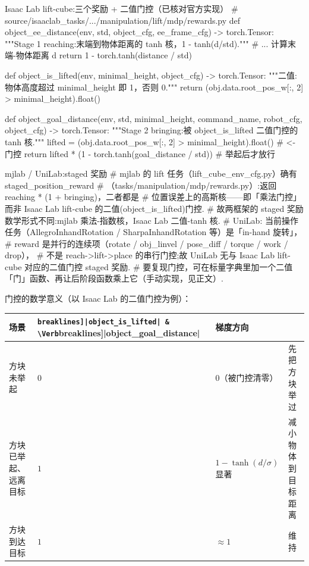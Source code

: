 \begin{codebox}[Python]{Isaac Lab lift-cube:三个奖励 + 二值门控（已核对官方实现）}
# source/isaaclab_tasks/.../manipulation/lift/mdp/rewards.py
def object_ee_distance(env, std, object_cfg, ee_frame_cfg) -> torch.Tensor:
    """Stage 1 reaching:末端到物体距离的 tanh 核，1 - tanh(d/std)."""
    # ... 计算末端-物体距离 d
    return 1 - torch.tanh(distance / std)

def object_is_lifted(env, minimal_height, object_cfg) -> torch.Tensor:
    """二值:物体高度超过 minimal_height 即 1，否则 0."""
    return (obj.data.root_pos_w[:, 2] > minimal_height).float()

def object_goal_distance(env, std, minimal_height, command_name,
                         robot_cfg, object_cfg) -> torch.Tensor:
    """Stage 2 bringing:被 object_is_lifted 二值门控的 tanh 核."""
    lifted = (obj.data.root_pos_w[:, 2] > minimal_height).float()   # <- 门控
    return lifted * (1 - torch.tanh(goal_distance / std))           # 举起后才放行
\end{codebox}

\begin{codebox}[Python]{mjlab / UniLab:staged 奖励}
# mjlab 的 lift 任务（lift_cube_env_cfg.py）确有 staged_position_reward
# （tasks/manipulation/mdp/rewards.py）:返回 reaching * (1 + bringing)，二者都是
# 位置误差上的高斯核——即「乘法门控」而非 Isaac Lab lift-cube 的二值(object_is_lifted)门控.
# 故两框架的 staged 奖励数学形式不同:mjlab 乘法-指数核，Isaac Lab 二值-tanh 核.
# UniLab: 当前操作任务（AllegroInhandRotation / SharpaInhandRotation 等）是「in-hand 旋转」，
#   reward 是并行的连续项（rotate / obj_linvel / pose_diff / torque / work / drop），
#   不是 reach->lift->place 的串行门控;故 UniLab 无与 Isaac Lab lift-cube 对应的二值门控 staged 奖励.
#   要复现门控，可在标量字典里加一个二值「门」函数、再让后阶段函数乘上它（手动实现，见正文）.
\end{codebox}

门控的数学意义（以 Isaac Lab 的二值门控为例）：

\begin{center}
\small
\begin{tabular}{@{}llll@{}}
\toprule
场景 & \Verb[breaklines]|object_is_lifted| & \Verb[breaklines]|object_goal_distance| & 梯度方向 \\
\midrule
方块未举起 & $0$ & $0$（被门控清零） & 先把方块举过 \Verb[breaklines]|minimal_height| \\
方块已举起、远离目标 & $1$ & $1-\tanh(d/\sigma)$ 显著 & 减小物体到目标距离 \\
方块到达目标 & $1$ & $\approx1$ & 维持 \\
\bottomrule
\end{tabular}
\end{center}

